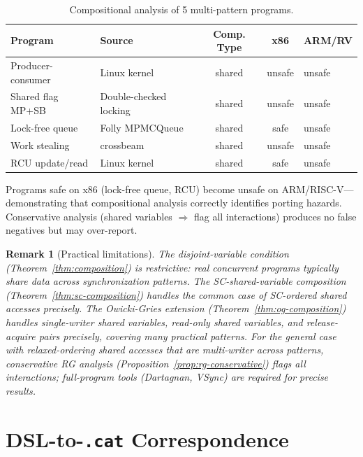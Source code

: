\documentclass[11pt]{article}
\newtheorem{remark}{Remark}
\begin{document}
\begin{table}[ht]
\centering
\caption{Compositional analysis of 5 multi-pattern programs.}
\label{tab:compositional}
\small
\begin{tabular}{llccl}
\toprule
\textbf{Program} & \textbf{Source} & \textbf{Comp. Type} & \textbf{x86} & \textbf{ARM/RV} \\
\midrule
Producer-consumer & Linux kernel & shared & unsafe & unsafe \\
Shared flag MP+SB & Double-checked locking & shared & unsafe & unsafe \\
Lock-free queue & Folly MPMCQueue & shared & safe & unsafe \\
Work stealing & crossbeam & shared & unsafe & unsafe \\
RCU update/read & Linux kernel & shared & safe & unsafe \\
\bottomrule
\end{tabular}
\end{table}

\noindent
Programs safe on x86 (lock-free queue, RCU) become unsafe on ARM/RISC-V---demonstrating
that compositional analysis correctly identifies porting hazards.
Conservative analysis (shared variables $\Rightarrow$ flag all interactions)
produces no false negatives but may over-report.

\begin{remark}[Practical limitations]
The disjoint-variable condition (Theorem~\ref{thm:composition}) is
restrictive: real concurrent programs typically share data across
synchronization patterns.
The SC-shared-variable composition (Theorem~\ref{thm:sc-composition})
handles the common case of SC-ordered shared accesses precisely.
The Owicki-Gries extension (Theorem~\ref{thm:og-composition}) handles
single-writer shared variables, read-only shared variables, and
release-acquire pairs precisely, covering many practical patterns.
For the general case with relaxed-ordering shared accesses that are
multi-writer across patterns, conservative RG analysis
(Proposition~\ref{prop:rg-conservative}) flags all interactions;
full-program tools (Dartagnan, VSync) are required for precise results.
\end{remark}

\section{DSL-to-\texttt{.cat} Correspondence}
\label{app:dsl-cat}
\end{document}
